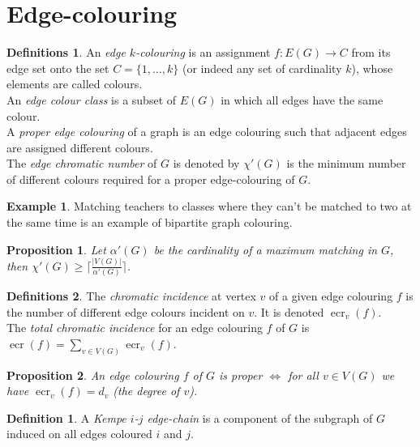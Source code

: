 \documentclass{article}
\newtheorem*{prop}{Proposition}
\theoremstyle{definition}
\newtheorem*{defn}{Definition}
\newtheorem*{defns}{Definitions}
\newtheorem*{ex}{Example}
\DeclareMathOperator{\ecr}{ecr}
\begin{document}

\section{Edge-colouring}

\begin{defns}
An \emph{edge $k$-colouring} is an assignment $f\colon E(G) \to C$ from its edge set onto the set $C=\{1,\ldots, k\}$ (or indeed any set of cardinality $k$), whose elements are called colours. \\
An \emph{edge colour class} is a subset of $E(G)$ in which all edges have the same colour. \\
A \emph{proper edge colouring} of a graph is an edge colouring such that adjacent edges are assigned different colours. \\
The \emph{edge chromatic number} of $G$ is denoted by $\chi'(G)$ is the minimum number of different colours required for a proper edge-colouring of $G$.
\end{defns}

\begin{ex}
Matching teachers to classes where they can't be matched to two at the same time is an example of bipartite graph colouring.
\end{ex}

\begin{prop}
Let $\alpha'(G)$ be the cardinality of a maximum matching in $G$, then $\chi'(G) \ge \lceil\frac{|V(G)|}{\alpha'(G)}\rceil$.
\end{prop}

\begin{defns}
The \emph{chromatic incidence} at vertex $v$ of a given edge colouring $f$ is the number of different edge colours incident on $v$.
It is denoted $\ecr_v(f)$.\\
The \emph{total chromatic incidence} for an edge colouring $f$ of $G$ is $\ecr(f) = \sum_{v\in V(G)} \ecr_v(f)$.
\end{defns}

\begin{prop}
An edge colouring $f$ of $G$ is proper $\iff$ for all $v\in V(G)$ we have $\ecr_v(f) = d_v$ (the degree of $v$).
\end{prop}

\begin{defn}
A \emph{Kempe $i$-$j$ edge-chain} is a component of the subgraph of $G$ induced on all edges coloured $i$ and $j$.
\end{defn}
\end{document}
